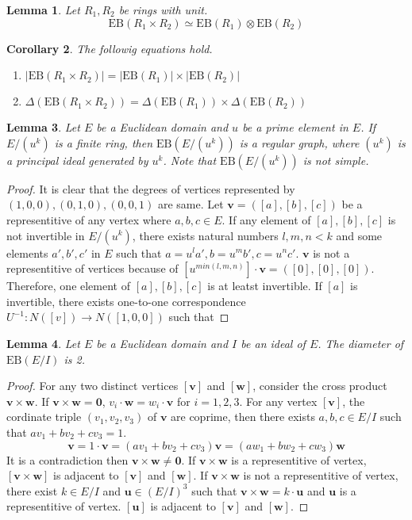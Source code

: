 \documentclass{article}
\newtheorem{Lem}{Lemma}
\newtheorem{Cor}[Lem]{Corollary}
\newcommand{\EB}{\mathrm{EB}}
\begin{document}
\begin{Lem}
Let $R_1, R_2$ be rings with unit. 
\[ \EB(R_1 \times R_2) \simeq \EB(R_1) \otimes \EB(R_2) \]
\end{Lem}

\begin{Cor}
The followig equations hold.
\begin{enumerate}
\item $ | \EB(R_1 \times R_2) | = | \EB(R_1) | \times | \EB(R_2) | $
\item $ \Delta(\EB(R_1 \times R_2)) = \Delta(\EB(R_1)) \times \Delta( \EB(R_2) )$
\end{enumerate}
\end{Cor}

\fi 

\begin{Lem}
Let $E$ be a Euclidean domain and $u$ be a prime element in $E$. If $E/(u^k)$ is a finite ring, then $\EB(E/(u^k))$ is a regular graph, where $(u^k)$ is a principal ideal generated by $u^k$. Note that $\EB(E/(u^k))$ is not simple.
\end{Lem}

\begin{proof}
It is clear that the degrees of vertices represented by $(1,0,0), (0,1,0), (0,0,1)$ are same.
Let ${\bm v} = ([a],[b],[c])$ be a representitive of any vertex where $a,b,c \in E$. 
If any element of $[a],[b],[c]$ is not invertible in $E/(u^k)$, 
there exists natural numbers $l,m,n < k$ and some elements $a',b',c'$ in $E$ such that $a=u^l a', b=u^m b', c=u^n c'$. ${\bm v}$ is not a representitive of vertices because of $[u^{min(l,m,n)}] \cdot {\bm v} = ([0],[0],[0])$. 
Therefore, one element of $[a],[b],[c]$ is at leatst invertible.
If $[a]$ is invertible, there exists one-to-one correspondence $U^{-1}: N([v]) \rightarrow N([1,0,0])$ such that 
\end{proof}

\begin{Lem}
Let $E$ be a Euclidean domain and $I$ be an ideal of $E$. The diameter of $\EB(E/I)$ is 2.
\end{Lem}

\begin{proof}
For any two distinct vertices $[\bm v]$ and $[\bm w]$, consider the cross product $\bm v \times \bm w$. If $\bm v \times \bm w = \bm 0$, $v_i \cdot \bm w = w_i \cdot \bm v$ for $i=1,2,3$. 
For any vertex $[\bm v]$, the cordinate triple $(v_1,v_2,v_3)$ of ${\bm v}$ are coprime, then there exists $a,b,c \in E/I$ such that $a v_1 + b v_2+ c v_3 = 1$.
\[ \bm v = 1 \cdot \bm v = ( a v_1 + b v_2+ c v_3 ) \bm v = ( a w_1 + b w_2 + c w_3 ) \bm w\]
It is a contradiction then $\bm v \times \bm w \neq \bm 0$. 
If $\bm v \times \bm w$ is a representitive of vertex, $[\bm v \times \bm w]$ is adjacent to $[\bm v]$ and $[\bm w]$.
If $\bm v \times \bm w$ is not a representitive of vertex, there exist $k \in E/I$ and $\bm u \in (E/I)^3$ such that $\bm v \times \bm w = k \cdot \bm u$ and $\bm u$ is a representitive of vertex. $[\bm u]$ is adjacent to $[\bm v]$ and $[\bm w]$.
\end{proof}
\end{document}
